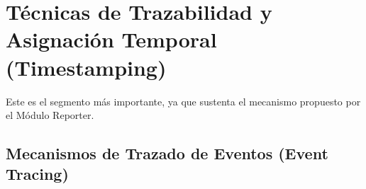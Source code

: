 
\section{Técnicas de Trazabilidad y Asignación Temporal (Timestamping)}
\label{sec:timestamping}

Este es el segmento más importante, ya que sustenta el mecanismo propuesto por el Módulo Reporter.

\subsection{Mecanismos de Trazado de Eventos (Event Tracing)}
\label{ssec:event_tracing}

